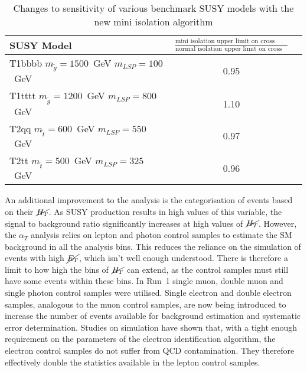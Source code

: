 \\\\
\begin{table}[h!]
  \caption{Changes to sensitivity of various benchmark SUSY models with the new mini isolation algorithm \label{tab:miniIsoResult}}
  \centering
  \footnotesize
  \begin{tabular}{ lcc }
    \hline
    \hline
    SUSY Model     & $\frac{\textrm{mini isolation upper limit on cross section}}{\textrm{normal isolation upper limit on cross section}}$\\ 
    \hline                                                                     
    T1bbbb $m_{\tilde{g}}=1500$~GeV $m_{LSP}=100$~GeV     & 0.95    \\  %
    T1tttt $m_{\tilde{g}}=1200$~GeV $m_{LSP}=800$~GeV      & 1.10    \\  %
    T2qq $m_{\tilde{t}}=600$~GeV $m_{LSP}=550$~GeV      & 0.97    \\  %
    T2tt $m_{\tilde{t}}=500$~GeV $m_{LSP}=325$~GeV       & 0.96    \\  %
    \hline
    \hline
  \end{tabular}
\end{table}

\noindent An additional improvement to the analysis is the categorisation of events based on their $\cancel{H_T}$. As SUSY production results in high values of this variable, the signal to background ratio significantly increases at high values of $\cancel{H_T}$. However, the $\alpha_T$ analysis relies on lepton and photon control samples to estimate the SM background in all the analysis bins. This reduces the reliance on the simulation of events with high $\cancel{E_T}$, which isn't well enough understood. There is therefore a limit to how high the bins of $\cancel{H_T}$ can extend, as the control samples must still have some events within these bins. In Run~1 single muon, double muon and single photon control samples were utilised. Single electron and double electron samples, analogous to the muon control samples, are now being introduced to increase the number of events available for background estimation and systematic error determination. Studies on simulation have shown that, with a tight enough requirement on the parameters of the electron identification algorithm, the electron control samples do not suffer from QCD contamination. They therefore effectively double the statistics available in the lepton control samples.
